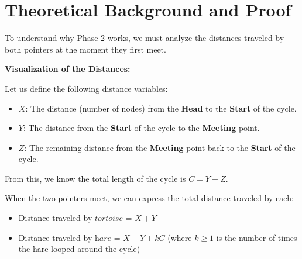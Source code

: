 \documentclass[12pt, letterpaper]{article}
\newcommand{\tortoise}{\textit{tortoise}}
\newcommand{\hare}{\textit{hare}}
\begin{document}
\section{Theoretical Background and Proof}
To understand why Phase 2 works, we must analyze the distances traveled by both pointers at the moment they first meet.

\textbf{Visualization of the Distances:}
\begin{center}
\end{center}

Let us define the following distance variables:
\begin{itemize}
    \item $X$: The distance (number of nodes) from the \textbf{Head} to the \textbf{Start} of the cycle.
    \item $Y$: The distance from the \textbf{Start} of the cycle to the \textbf{Meeting} point.
    \item $Z$: The remaining distance from the \textbf{Meeting} point back to the \textbf{Start} of the cycle.
\end{itemize}

From this, we know the total length of the cycle is $C = Y + Z$.

When the two pointers meet, we can express the total distance traveled by each:
\begin{itemize}
    \item Distance traveled by \(\tortoise\) = $X + Y$
    \item Distance traveled by \(\hare\) = $X + Y + kC$ \quad (where $k \ge 1$ is the number of times the hare looped around the cycle)
\end{itemize}
\end{document}

